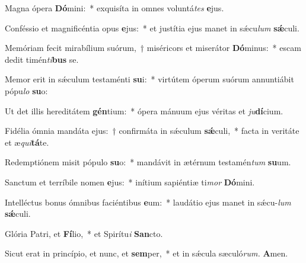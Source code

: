 \item Magna ópera \textbf{Dó}mini:~* exquisíta in omnes voluntá\hspace{0.03em}\textit{tes} \textbf{e}jus.
\item Conféssio et magnificéntia opus \textbf{e}jus:~* et justítia ejus manet in sǽcu\hspace{0.03em}\textit{lum} \textbf{sǽ}culi.
\item Memóriam fecit mirabílium suórum,~† miséricors et miserátor \textbf{Dó}minus:~* escam dedit timén\textit{ti}\textbf{bus} se.
\item Memor erit in sǽculum testaménti \textbf{su}i:~* virtútem óperum suórum annuntiábit pópu\hspace{0.03em}\textit{lo} \textbf{su}o:
\item Ut det illis hereditátem \textbf{gén}tium:~* ópera mánuum ejus véritas et \textit{ju}\textbf{dí}cium.
\item Fidélia ómnia mandáta ejus:~† confirmáta in sǽculum \textbf{sǽ}culi,~* facta in veritáte et æ\hspace{0.03em}\textit{qui}\textbf{tá}te.
\item Redemptiónem misit pópulo \textbf{su}o:~* mandávit in ætérnum testamén\hspace{0.03em}\textit{tum} \textbf{su}um.
\item Sanctum et terríbile nomen \textbf{e}jus:~* inítium sapiéntiæ ti\textit{mor} \textbf{Dó}mini.
\item Intelléctus bonus ómnibus faciéntibus \textbf{e}um:~* laudátio ejus manet in sǽcu-\hspace{0.03em}\textit{lum} \textbf{sǽ}culi.
\item Glória Patri, et \textbf{Fí}lio,~* et Spirítu\textit{i} \textbf{San}cto.
\item Sicut erat in princípio, et nunc, et \textbf{sem}per,~* et in sǽcula sæculó\textit{rum.} \textbf{A}men.


